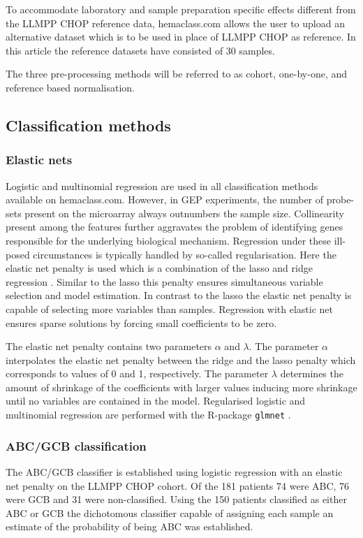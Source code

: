 \documentclass[10pt]{bmc_article}
\newenvironment{bmcformat}{\fussy\setboolean{publ}{true}}{\fussy}
\begin{document}
\begin{bmcformat}
To accommodate laboratory and sample preparation specific effects different from the LLMPP CHOP reference data, hemaclass.com allows the user to upload an alternative dataset which is to be used in place of LLMPP CHOP as reference. In this article the reference datasets have consisted of 30 samples.

The three pre-processing methods will be referred to as cohort, one-by-one, and reference based normalisation.

\subsection*{Classification methods}

\subsubsection*{Elastic nets}
Logistic and multinomial regression are used in all classification methods available on hemaclass.com. However, in GEP experiments, the number of probe-sets present on the microarray always outnumbers the sample size. Collinearity present among the features further aggravates the problem of identifying genes responsible for the underlying biological mechanism. Regression under these ill-posed circumstances is typically handled by so-called regularisation. Here the elastic net penalty \cite{Friedman2010, Zou2005} is used which is a combination of the lasso \cite{Tibshirani1996} and ridge regression \cite{Hoerl1970}. Similar to the lasso this penalty ensures simultaneous variable selection and model estimation. In contrast to the lasso the elastic net penalty is capable of selecting more variables than samples. Regression with elastic net ensures sparse solutions by forcing small coefficients to be zero.

The elastic net penalty contains two parameters $\alpha$ and $\lambda$. The parameter $\alpha$ interpolates the elastic net penalty between the ridge and the lasso penalty which corresponds to values of 0 and 1, respectively. The parameter $\lambda$ determines the amount of shrinkage of the coefficients with larger values inducing more shrinkage until no variables are contained in the model. Regularised logistic and multinomial regression are performed with the R-package \texttt{glmnet} \cite{Friedman2010}.

\subsubsection*{ABC/GCB classification}
The ABC/GCB classifier is established using logistic regression with an elastic net penalty on the LLMPP CHOP cohort. Of the 181 patients 74 were ABC, 76 were GCB and 31 were non-classified. Using the 150 patients classified as either ABC or GCB the dichotomous classifier capable of assigning each sample an estimate of the probability of being ABC was established.


\end{bmcformat}
\end{document}

